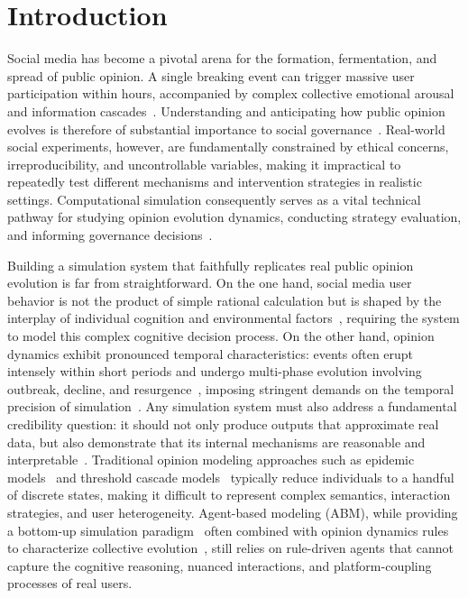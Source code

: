 \documentclass[a4paper,fleqn]{cas-dc}
\begin{document}
\section{Introduction}\label{sec:intro}

Social media has become a pivotal arena for the formation, fermentation, and spread of public opinion. A single breaking event can trigger massive user participation within hours, accompanied by complex collective emotional arousal~\citep{gonzalez_emotional_2010} and information cascades~\citep{goldstein_structure_2012}. Understanding and anticipating how public opinion evolves is therefore of substantial importance to social governance~\citep{WU2025127823}. Real-world social experiments, however, are fundamentally constrained by ethical concerns, irreproducibility, and uncontrollable variables, making it impractical to repeatedly test different mechanisms and intervention strategies in realistic settings. Computational simulation consequently serves as a vital technical pathway for studying opinion evolution dynamics, conducting strategy evaluation, and informing governance decisions~\citep{bonabeau_agent-based_2002}.

Building a simulation system that faithfully replicates real public opinion evolution is far from straightforward. On the one hand, social media user behavior is not the product of simple rational calculation but is shaped by the interplay of individual cognition and environmental factors~\citep{buckels2014trolls}, requiring the system to model this complex cognitive decision process. On the other hand, opinion dynamics exhibit pronounced temporal characteristics: events often erupt intensely within short periods and undergo multi-phase evolution involving outbreak, decline, and resurgence~\citep{ZHOU2024121307}, imposing stringent demands on the temporal precision of simulation~\citep{zhao_seismic_2015}. Any simulation system must also address a fundamental credibility question: it should not only produce outputs that approximate real data, but also demonstrate that its internal mechanisms are reasonable and interpretable~\citep{mcculloch_calibrating_2022}. Traditional opinion modeling approaches such as epidemic models~\citep{daley_stochastic_1965} and threshold cascade models~\citep{granovetter_threshold_1978} typically reduce individuals to a handful of discrete states, making it difficult to represent complex semantics, interaction strategies, and user heterogeneity. Agent-based modeling (ABM), while providing a bottom-up simulation paradigm~\citep{macal_tutorial_2010} often combined with opinion dynamics rules to characterize collective evolution~\citep{castellano_statistical_2009}, still relies on rule-driven agents that cannot capture the cognitive reasoning, nuanced interactions, and platform-coupling processes of real users.
\end{document}
